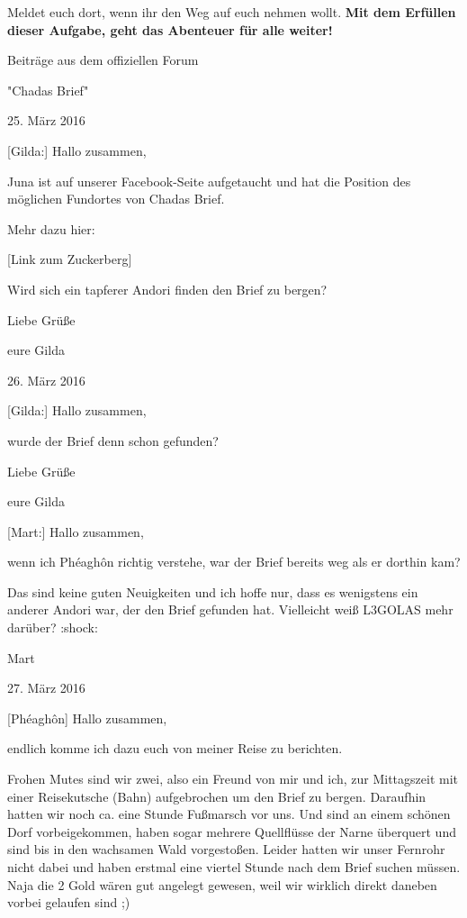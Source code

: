 \documentclass[10pt, a4paper, oneside]{book}
\begin{document}
\begin{multicols}{2}
Meldet euch dort, wenn ihr den Weg auf euch nehmen wollt. \textbf{Mit dem Erfüllen dieser Aufgabe, geht das Abenteuer für alle weiter!}

\begin{center}
    Beiträge aus dem offiziellen Forum

    "Chadas Brief" 

    25. März 2016
\end{center}


[Gilda:] Hallo zusammen,

Juna ist auf unserer Facebook-Seite aufgetaucht und hat die Position des möglichen Fundortes von Chadas Brief.

Mehr dazu hier:

[Link zum Zuckerberg]

Wird sich ein tapferer Andori finden den Brief zu bergen?

Liebe Grüße

eure Gilda

\begin{center}
    26. März 2016
\end{center}

[Gilda:] Hallo zusammen,

wurde der Brief denn schon gefunden?

Liebe Grüße

eure Gilda

[Mart:] Hallo zusammen,

wenn ich Phéaghôn richtig verstehe, war der Brief bereits weg als er dorthin kam?

Das sind keine guten Neuigkeiten und ich hoffe nur, dass es wenigstens ein anderer Andori war, der den Brief gefunden hat. Vielleicht weiß L3GOLAS mehr darüber? :shock:

Mart

\begin{center}
    27. März 2016
\end{center}



[Phéaghôn] Hallo zusammen,

endlich komme ich dazu euch von meiner Reise zu berichten.

Frohen Mutes sind wir zwei, also ein Freund von mir und ich, zur Mittagszeit mit einer Reisekutsche (Bahn) aufgebrochen um den Brief zu bergen. Daraufhin hatten wir noch ca. eine Stunde Fußmarsch vor uns. Und sind an einem schönen Dorf vorbeigekommen, haben sogar mehrere Quellflüsse der Narne überquert und sind bis in den wachsamen Wald vorgestoßen. Leider hatten wir unser Fernrohr nicht dabei und haben erstmal eine viertel Stunde nach dem Brief suchen müssen. Naja die 2 Gold wären gut angelegt gewesen, weil wir wirklich direkt daneben vorbei gelaufen sind ;)


\end{multicols}
\end{document}
